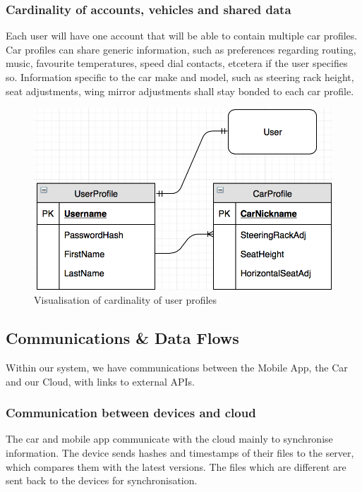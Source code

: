 \documentclass{article}
\begin{document}
\subsubsection{Cardinality of accounts, vehicles and shared data}
Each user will have one account that will be able to contain multiple car profiles. Car profiles can share generic information, such as preferences regarding routing, music, favourite temperatures, speed dial contacts, etcetera if the user specifies so. Information specific to the car make and model, such as steering rack height, seat adjustments, wing mirror adjustments shall stay bonded to each car profile.
\begin{figure}[H]
  \centering
  \includegraphics[scale=0.7]{profile-cardinality}
  \caption{Visualisation of cardinality of user profiles}\label{cardinality}
\end{figure}

\subsection{Communications \& Data Flows}\label{ssec:communications-data} %
Within our system, we have communications between the Mobile App, the Car and our Cloud, with links to external APIs.

\subsubsection{Communication between devices and cloud}\label{sssec:car-cloud}
The car and mobile app communicate with the cloud mainly to synchronise information. The device sends hashes and timestamps of their files to the server, which compares them with the latest versions. The files which are different are sent back to the devices for synchronisation.
\end{document}
